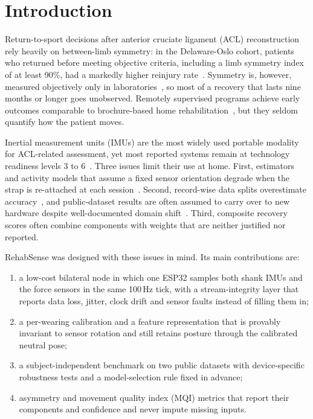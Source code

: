 \documentclass[conference]{IEEEtran}
\begin{document}
\section{Introduction}

Return-to-sport decisions after anterior cruciate ligament (ACL) reconstruction rely heavily on between-limb symmetry: in the Delaware-Oslo cohort, patients who returned before meeting objective criteria, including a limb symmetry index of at least 90\%, had a markedly higher reinjury rate~\cite{grindem2016}. Symmetry is, however, measured objectively only in laboratories~\cite{tan2023}, so most of a recovery that lasts nine months or longer goes unobserved. Remotely supervised programs achieve early outcomes comparable to brochure-based home rehabilitation~\cite{lim2024}, but they seldom quantify how the patient moves.

Inertial measurement units (IMUs) are the most widely used portable modality for ACL-related assessment, yet most reported systems remain at technology readiness levels 3 to 6~\cite{tan2023,ptaszyk2025}. Three issues limit their use at home. First, estimators and activity models that assume a fixed sensor orientation degrade when the strap is re-attached at each session~\cite{yurtman2017,baek2026}. Second, record-wise data splits overestimate accuracy~\cite{saeb2017}, and public-dataset results are often assumed to carry over to new hardware despite well-documented domain shift~\cite{hong2024,napoli2024}. Third, composite recovery scores often combine components with weights that are neither justified nor reported.

RehabSense was designed with these issues in mind. Its main contributions are:
\begin{enumerate}
\item a low-cost bilateral node in which one ESP32 samples both shank IMUs and the force sensors in the same 100\,Hz tick, with a stream-integrity layer that reports data loss, jitter, clock drift and sensor faults instead of filling them in;
\item a per-wearing calibration and a feature representation that is provably invariant to sensor rotation and still retains posture through the calibrated neutral pose;
\item a subject-independent benchmark on two public datasets with device-specific robustness tests and a model-selection rule fixed in advance;
\item asymmetry and movement quality index (MQI) metrics that report their components and confidence and never impute missing inputs.
\end{enumerate}
\end{document}
